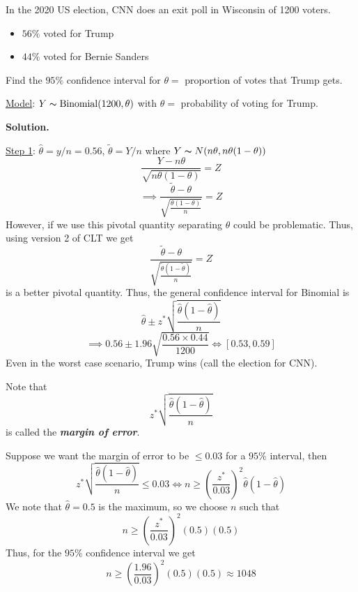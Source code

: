 \begin{exbox}
    \begin{example}
        In the 2020 US election, CNN does an exit poll in Wisconsin of 1200 voters.
        \begin{itemize}
            \item $ 56\% $ voted for Trump
            \item $ 44\% $ voted for Bernie Sanders
        \end{itemize}
        Find the $ 95\% $ confidence interval for $ \theta= $ proportion of votes that
        Trump gets.

        \underline{Model}: $ Y \thicksim \operatorname{Binomial}(1200,\theta) $ with $ \theta= $ probability of
        voting for Trump.

        \textbf{Solution.}

        \underline{Step 1}: $ \hat{\theta}=y/n=0.56 $, $ \tilde{\theta}=Y/n $
        where $ Y \thicksim N(n\theta,n\theta(1-\theta)) $
        \[ \frac{Y-n\theta}{\sqrt{n\theta(1-\theta)}}=Z  \]
        \[ \implies \frac{\tilde{\theta}-\theta}{\sqrt{\frac{\theta(1-\theta)}{n}}}=Z  \]
        However, if we use this pivotal quantity separating $ \theta $ could be problematic.
        Thus, using version 2 of CLT we get
        \[ \frac{\tilde{\theta}-\theta}{\sqrt{\frac{\tilde{\theta}(1-\tilde{\theta})}{n}}}=Z \]
        is a better pivotal quantity.
        Thus, the general confidence interval for Binomial is
        \[ \hat{\theta}\pm z^*\sqrt{\frac{\hat{\theta}\left(1-\hat{\theta}\right)}{n} } \]
        \[ \implies 0.56\pm 1.96\sqrt{\frac{0.56\times 0.44}{1200}}\iff \left[ 0.53,0.59 \right] \]
        Even in the worst case scenario, Trump wins (call the election for CNN).

        Note that
        \[ z^*\sqrt{\frac{\hat{\theta}\left(1-\hat{\theta}\right)} {n}} \]
        is called the \textbf{\emph{margin of error}}.

        Suppose we want the margin of error to be $ \leqslant 0.03 $ for a $ 95\% $ interval, then
        \[ z^*\sqrt{\frac{\hat{\theta}\left(1-\hat{\theta}\right)}{n}}\leqslant 0.03\iff
            n\geqslant \left( \frac{z^*}{0.03}  \right)^2\hat{\theta}\left(1-\hat{\theta}\right) \]
        We note that $ \hat{\theta}=0.5 $ is the maximum, so we choose $ n $ such that
        \[ n\geqslant \left( \frac{z^*}{0.03}  \right)^2(0.5)(0.5) \]
        Thus, for the $ 95\% $ confidence interval we get
        \[ n\geqslant \left( \frac{1.96}{0.03} \right)^2(0.5)(0.5)\approx 1048 \]
    \end{example}
\end{exbox}
